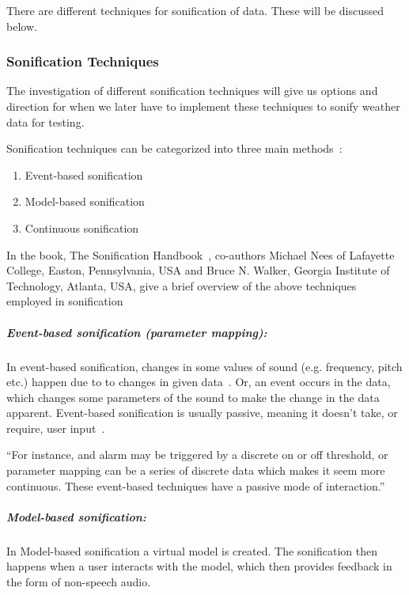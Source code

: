There are different techniques for sonification of data. 
These will be discussed below.



\subsubsection{Sonification Techniques} %
\label{ssub:sonification_techniques}


The investigation of different sonification techniques will give us options and direction for when we later have to implement these techniques to sonify weather data for testing.

\label{par:techniques}

Sonification techniques can be categorized into three main methods~\cite*[pp.15]{Hermann2011}:

\begin{enumerate}
    \item Event-based sonification
    \item Model-based sonification
    \item Continuous sonification
\end{enumerate}

In the book, The Sonification Handbook~\cite*{Hermann2011}, co-authors Michael Nees of Lafayette College, Easton, Pennsylvania, USA and Bruce N. Walker, Georgia Institute of Technology, Atlanta, USA, give a brief overview of the above techniques employed in sonification~\cite*[pp.16]{Hermann2011}

\subparagraph{Event-based sonification (parameter mapping):}
\label{subp:eventbased}

In event-based sonification, \linebreak changes in some values of sound (e.g. frequency, pitch etc.) happen due to to changes in given data~\cite*[pp.16]{Hermann2011}. 
Or, an event occurs in the data, which changes some parameters of the sound to make the change in the data apparent. 
Event-based sonification is usually passive, meaning it doesn’t take, or require, user input~\cite*[pp.16]{Hermann2011}.

\enquote{For instance, and alarm may be triggered by a discrete on or off threshold, or parameter mapping can be a series of discrete data which makes it seem more continuous. These event-based techniques have a passive mode of interaction.}~\cite*[pp.16]{Hermann2011}

\subparagraph{Model-based sonification:} %
\label{subp:model_based_sonification_}
In Model-based sonification a virtual model is created. 
The sonification then happens when a user interacts with the model, which then provides feedback in the form of non-speech audio.

